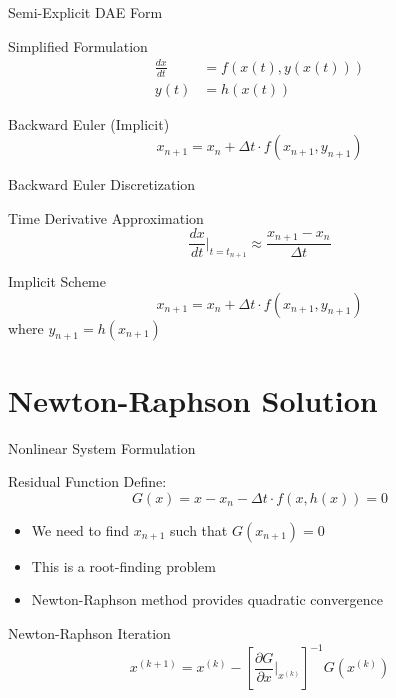 \begin{frame}{Semi-Explicit DAE Form}
\begin{block}{Simplified Formulation}
\begin{align}
\frac{dx}{dt} &= f(x(t), y(x(t))) \\
y(t) &= h(x(t))
\end{align}
\end{block}

\begin{block}{Backward Euler (Implicit)}
\begin{equation}
x_{n+1} = x_n + \Delta t \cdot f(x_{n+1}, y_{n+1})
\end{equation}
\end{block}
\end{frame}

\begin{frame}{Backward Euler Discretization}
\begin{block}{Time Derivative Approximation}
\begin{equation}
\frac{dx}{dt}\bigg|_{t=t_{n+1}} \approx \frac{x_{n+1} - x_n}{\Delta t}
\end{equation}
\end{block}

\begin{block}{Implicit Scheme}
\begin{equation}
x_{n+1} = x_n + \Delta t \cdot f(x_{n+1}, y_{n+1})
\end{equation}
where $y_{n+1} = h(x_{n+1})$
\end{block}
\end{frame}

\section{Newton-Raphson Solution}

\begin{frame}{Nonlinear System Formulation}
\begin{block}{Residual Function}
Define:
\begin{equation}
G(x) = x - x_n - \Delta t \cdot f(x, h(x)) = 0
\end{equation}
\end{block}

\begin{itemize}
\item We need to find $x_{n+1}$ such that $G(x_{n+1}) = 0$
\item This is a root-finding problem
\item Newton-Raphson method provides quadratic convergence
\end{itemize}

\begin{block}{Newton-Raphson Iteration}
\begin{equation}
x^{(k+1)} = x^{(k)} - \left[\frac{\partial G}{\partial x}\bigg|_{x^{(k)}}\right]^{-1} G(x^{(k)})
\end{equation}
\end{block}
\end{frame}

